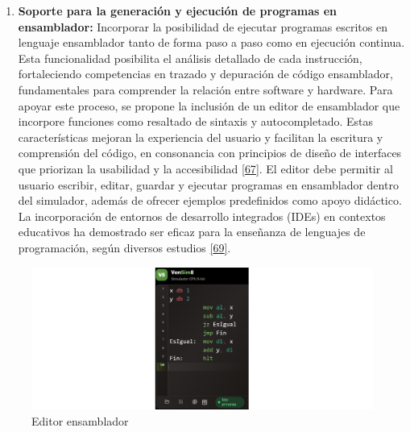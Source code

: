 \documentclass[12pt,oneside]{templates/unerthesis}
\providecommand{\tightlist}{%
  \setlength{\itemsep}{0pt}\setlength{\parskip}{0pt}}
\begin{document}
\begin{enumerate}
\def\labelenumi{\arabic{enumi}.}
\setcounter{enumi}{1}
\tightlist
\item
  \textbf{Soporte para la generación y ejecución de programas en ensamblador:}
  Incorporar la posibilidad de ejecutar programas escritos en lenguaje ensamblador tanto de forma paso a paso como en ejecución continua. Esta funcionalidad posibilita el análisis detallado de cada instrucción, fortaleciendo competencias en trazado y depuración de código ensamblador, fundamentales para comprender la relación entre software y hardware.
  Para apoyar este proceso, se propone la inclusión de un editor de ensamblador que incorpore funciones como resaltado de sintaxis y autocompletado. Estas características mejoran la experiencia del usuario y facilitan la escritura y comprensión del código, en consonancia con principios de diseño de interfaces que priorizan la usabilidad y la accesibilidad \protect\hyperlink{ref-w3c_accessibility_2021}{{[}67{]}}. El editor debe permitir al usuario escribir, editar, guardar y ejecutar programas en ensamblador dentro del simulador, además de ofrecer ejemplos predefinidos como apoyo didáctico. La incorporación de entornos de desarrollo integrados (IDEs) en contextos educativos ha demostrado ser eficaz para la enseñanza de lenguajes de programación, según diversos estudios \protect\hyperlink{ref-mccracken2001does}{{[}69{]}}.
\end{enumerate}

\begin{figure}

{\centering \includegraphics[width=0.9\linewidth]{images/editor} 

}

\caption{Editor ensamblador}\label{fig:editor}
\end{figure}
\end{document}
